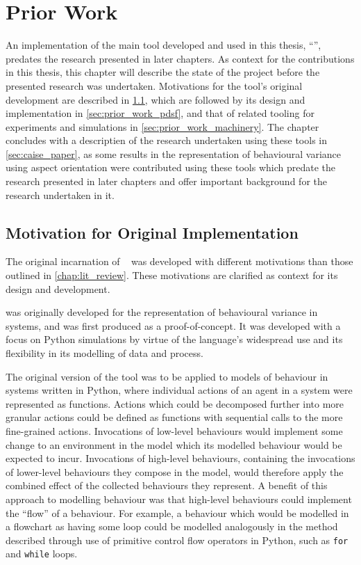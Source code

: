 \chapter{Prior Work}\label{chap:prior_work}


An implementation of the main tool developed and used in this thesis,
``\pdsf{}'', predates the research presented in later chapters. As context for
the contributions in this thesis, this chapter will describe the state of the
project before the presented research was undertaken. Motivations for the tool's
original development are described in \cref{sec:pdsf_motivations}, which are
followed by its design and implementation in \cref{sec:prior_work_pdsf}, and
that of related tooling for experiments and simulations in
\cref{sec:prior_work_machinery}. The chapter concludes with a descriptien of the
research undertaken using these tools in \cref{sec:caise_paper}, as some results
in the representation of behavioural variance using aspect orientation were
contributed using these tools which predate the research presented in later
chapters and offer important background for the research undertaken in it.

\section{Motivation for Original Implementation}\label{sec:pdsf_motivations}

The original incarnation of \pdsf{}~\cite{wallis2018caise} was developed with
different motivations than those outlined in \cref{chap:lit_review}. These
motivations are clarified as context for its design and
development.

\pdsf{} was originally developed for the representation of behavioural variance
in \sociotechnical systems, and was first produced as a proof-of-concept. It was
developed with a focus on Python simulations by virtue of the language's widespread
use and its flexibility in its modelling of data and process.

The original version of the tool was to be applied to models of behaviour in
\sociotechnical systems written in Python, where individual actions of an agent
in a system were represented as functions. Actions which could be decomposed
further into more granular actions could be defined as functions with sequential
calls to the more fine-grained actions. Invocations of low-level
behaviours would implement some change to an environment in the model which its
modelled behaviour would be expected to incur. Invocations of high-level
behaviours, containing the invocations of lower-level behaviours they compose in
the model, would therefore apply the combined effect of the collected behaviours
they represent. A benefit of this approach to modelling behaviour was that
high-level behaviours could implement the ``flow'' of a behaviour. For example,
a behaviour which would be modelled in a flowchart as having some loop could be
modelled analogously in the method described through use of primitive control
flow operators in Python, such as \lstinline{for} and \lstinline{while} loops.

